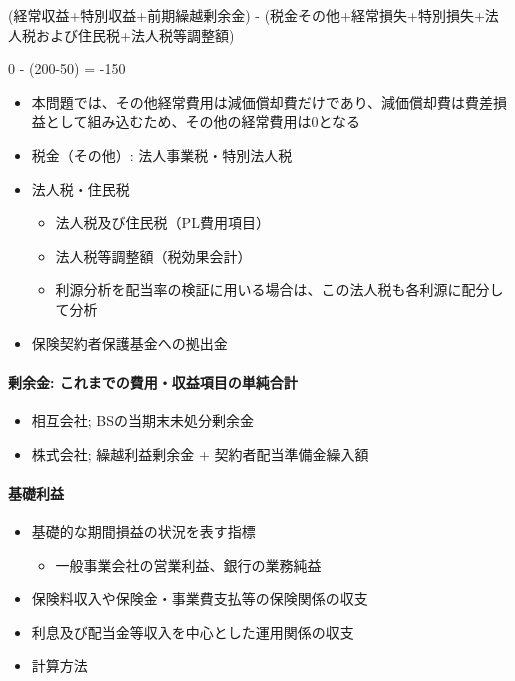 \documentclass[report,gutter=10mm,fore-edge=10mm,uplatex,dvipdfmx]{jlreq}
\begin{document}
(経常収益+特別収益+前期繰越剰余金) -
(税金その他+経常損失+特別損失+法人税および住民税+法人税等調整額)

0 - (200-50) = -150

\begin{itemize}
\item
  本問題では、その他経常費用は減価償却費だけであり、減価償却費は費差損益として組み込むため、その他の経常費用は0となる
\item
  税金（その他）: 法人事業税・特別法人税
\item
  法人税・住民税

  \begin{itemize}
  \tightlist
  \item
    法人税及び住民税（PL費用項目）
  \item
    法人税等調整額（税効果会計）
  \item
    利源分析を配当率の検証に用いる場合は、この法人税も各利源に配分して分析
  \end{itemize}
\item
  保険契約者保護基金への拠出金
\end{itemize}

\paragraph{剰余金:
これまでの費用・収益項目の単純合計}

\begin{itemize}
\tightlist
\item
  相互会社; BSの当期末未処分剰余金
\item
  株式会社; 繰越利益剰余金 + 契約者配当準備金繰入額
\end{itemize}

\paragraph{基礎利益}

\begin{itemize}
\item
  基礎的な期間損益の状況を表す指標

  \begin{itemize}
  \tightlist
  \item
    一般事業会社の営業利益、銀行の業務純益
  \end{itemize}
\item
  保険料収入や保険金・事業費支払等の保険関係の収支
\item
  利息及び配当金等収入を中心とした運用関係の収支
\item
  計算方法
\end{itemize}
\end{document}
